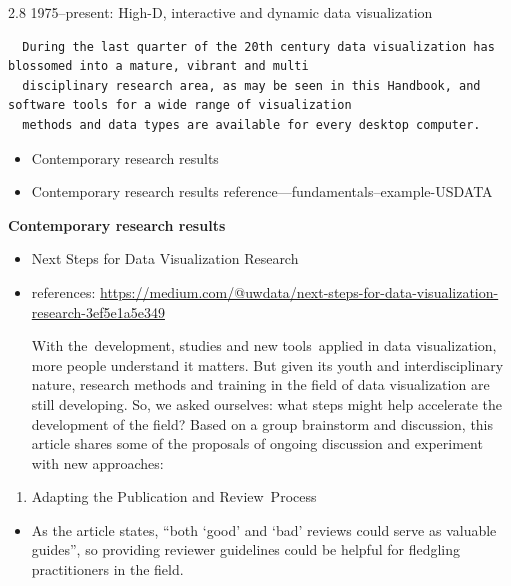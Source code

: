 \documentclass[]{book}
\providecommand{\tightlist}{%
  \setlength{\itemsep}{0pt}\setlength{\parskip}{0pt}}
\theoremstyle{definition}
\theoremstyle{definition}
\theoremstyle{definition}
\theoremstyle{remark}
\begin{document}
\begin{enumerate}
  2.8 1975--present: High-D, interactive and dynamic data visualization

\begin{verbatim}
  During the last quarter of the 20th century data visualization has blossomed into a mature, vibrant and multi
  disciplinary research area, as may be seen in this Handbook, and software tools for a wide range of visualization
  methods and data types are available for every desktop computer.
\end{verbatim}
\end{enumerate}

\begin{itemize}
\tightlist
\item
  Contemporary research results
\item
  Contemporary research results reference---fundamentals--example-USDATA
\end{itemize}

\textbf{Contemporary research results}

\begin{itemize}
\item
  Next Steps for Data Visualization Research
\item
  references:
  \url{https://medium.com/@uwdata/next-steps-for-data-visualization-research-3ef5e1a5e349}

  With the~development, studies and new tools~applied in data
  visualization, more people understand it matters. But given its youth
  and interdisciplinary nature, research methods and training in the
  field of data visualization are still developing. So, we asked
  ourselves: what steps might help accelerate the development of the
  field? Based on a group brainstorm and discussion, this article shares
  some of the proposals of ongoing discussion and experiment with new
  approaches:
\end{itemize}

\begin{enumerate}
\def\labelenumi{\arabic{enumi}.}
\tightlist
\item
  Adapting the Publication and Review~Process
\end{enumerate}

\begin{itemize}
\tightlist
\item
  As the article states, ``both `good' and `bad' reviews could serve as
  valuable guides'', so providing reviewer guidelines could be helpful
  for fledgling practitioners in the field.
\end{itemize}
\end{document}
